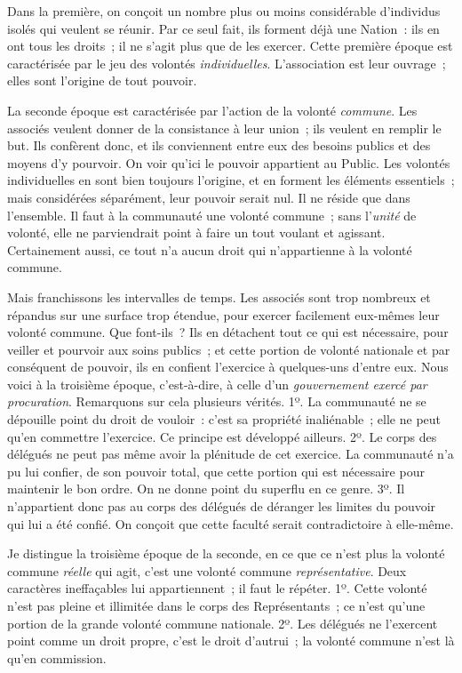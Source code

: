 \documentclass[french,twoside]{book} %
\begin{document}
Dans la première, on conçoit un nombre plus ou moins considérable d’individus isolés qui veulent se réunir. Par ce seul fait, ils forment déjà une Nation : ils en ont tous les droits ; il ne s’agit plus que de les exercer. Cette première époque est caractérisée par le jeu des volontés {\itshape individuelles}. L’association est leur ouvrage ; elles sont l’origine de tout pouvoir.\par
La seconde époque est caractérisée par l’action de la volonté {\itshape commune}. Les associés veulent donner de la consistance à leur union ; ils veulent en remplir le but. Ils confèrent donc, et ils conviennent entre eux des besoins publics et des moyens d’y pourvoir. On voir qu’ici le pouvoir appartient au Public. Les volontés individuelles en sont bien toujours l’origine, et en forment les éléments essentiels ; mais considérées séparément, leur pouvoir serait nul. Il ne réside que dans l’ensemble. Il faut à la communauté une volonté commune ; sans l’{\itshape unité} de volonté, elle ne parviendrait point à faire un tout voulant et agissant. Certainement aussi, ce tout n’a aucun droit qui n’appartienne à la volonté commune.\par
Mais franchissons les intervalles de temps. Les associés sont trop nombreux et répandus sur une surface trop étendue, pour exercer facilement eux-mêmes leur volonté commune. Que font-ils ? Ils en détachent tout ce qui est nécessaire, pour veiller et pourvoir aux soins publics ; et cette portion de volonté nationale et par conséquent de pouvoir, ils en confient l’exercice à quelques-uns d’entre eux. Nous voici à la troisième époque, c’est-à-dire, à celle d’un {\itshape gouvernement exercé par procuration}. Remarquons sur cela plusieurs vérités. 1º. La communauté ne se dépouille point du droit de vouloir : c’est sa propriété inaliénable ; elle ne peut qu’en commettre l’exercice. Ce principe est développé ailleurs. 2º. Le corps des délégués ne peut pas même avoir la plénitude de cet exercice. La communauté n’a pu lui confier, de son pouvoir total, que cette portion qui est nécessaire pour maintenir le bon ordre. On ne donne point du superflu en ce genre. 3º. Il n’appartient donc pas au corps des délégués de déranger les limites du pouvoir qui lui a été confié. On conçoit que cette faculté serait contradictoire à elle-même.\par
Je distingue la troisième époque de la seconde, en ce que ce n’est plus la volonté commune {\itshape réelle} qui agit, c’est une volonté commune {\itshape représentative}. Deux caractères ineffaçables lui appartiennent ; il faut le répéter. 1º. Cette volonté n’est pas pleine et illimitée dans le corps des Représentants ; ce n’est qu’une portion de la grande volonté commune nationale. 2º. Les délégués ne l’exercent point comme un droit propre, c’est le droit d’autrui ; la volonté commune n’est là qu’en commission.\par
\end{document}
